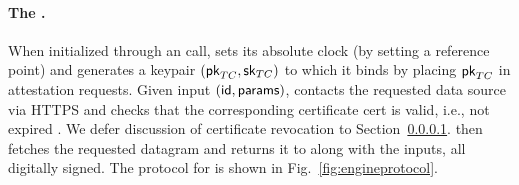 \paragraph{The \encname \engine.} When initialized through an \initcall call, \engine sets its absolute clock (by setting a reference point) and generates a keypair $({\sf pk}_{TC},{\sf sk}_{TC})$ to which it binds by placing ${\sf pk}_{TC}$ in attestation requests. Given input \resumecall $({\sf id}, {\sf params})$, \engine contacts the requested data source via HTTPS and checks that the corresponding certificate {\sf cert} is valid, i.e., not expired . We defer discussion of certificate revocation to Section~\ref{}. \engine then fetches the requested datagram and returns it to \relay along with the inputs, all digitally signed. The protocol for \engine is shown in Fig.~\ref{fig:engineprotocol}.


